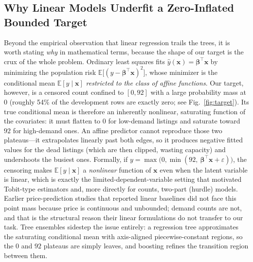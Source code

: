 \documentclass[journal]{IEEEtran}
\begin{document}
\subsection{Why Linear Models Underfit a Zero-Inflated Bounded Target}
\label{sec:linearcritique}
Beyond the empirical observation that linear regression trails the trees, it is
worth stating \emph{why} in mathematical terms, because the shape of our target
is the crux of the whole problem. Ordinary least squares fits
$\hat y(\mathbf{x}) = \boldsymbol{\beta}^{\top}\mathbf{x}$ by minimizing the
population risk $\mathbb{E}\big[(y-\boldsymbol{\beta}^{\top}\mathbf{x})^{2}\big]$,
whose minimizer is the conditional mean $\mathbb{E}[y\mid\mathbf{x}]$
\emph{restricted to the class of affine functions}. Our target, however, is a
censored count confined to $[0,92]$ with a large probability mass at $0$
(roughly 54\% of the development rows are exactly zero; see
Fig.~\ref{fig:target}). Its true conditional mean is therefore an inherently
nonlinear, saturating function of the covariates: it must flatten to $0$ for
low-demand listings and saturate toward $92$ for high-demand ones. An affine
predictor cannot reproduce those two plateaus---it extrapolates linearly past
both edges, so it produces negative fitted values for the dead listings (which
are then clipped, wasting capacity) and undershoots the busiest ones. Formally,
if $y=\max\!\big(0,\min(92,\ \boldsymbol{\beta}^{\top}\mathbf{x}+\varepsilon)\big)$,
the censoring makes $\mathbb{E}[y\mid\mathbf{x}]$ a \emph{nonlinear} function of
$\mathbf{x}$ even when the latent variable is linear, which is exactly the
limited-dependent-variable setting that motivated Tobit-type estimators
\cite{tobin1958} and, more directly for counts, two-part (hurdle) models.
Earlier price-prediction studies that reported linear baselines
\cite{gunter2018,wang2017} did not face this point mass because price is
continuous and unbounded; demand counts are not, and that is the structural
reason their linear formulations do not transfer to our task. Tree ensembles
sidestep the issue entirely: a regression tree approximates the saturating
conditional mean with axis-aligned piecewise-constant regions, so the $0$ and
$92$ plateaus are simply leaves, and boosting refines the transition region
between them.
\end{document}
